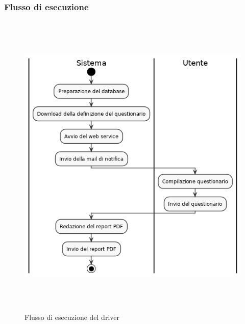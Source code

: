 \documentclass[../main.tex]{subfiles}
\begin{document}
\subsubsection{Flusso di esecuzione}
\begin{figure}[H]
\centering
\includegraphics[height=15cm]{immagini/DRIVER_SURVEY.png}
\caption{Flusso di esecuzione del driver}\label{fig:flussodriver2}

\end{figure}
\end{document}
